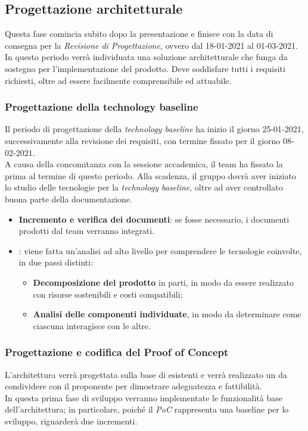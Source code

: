 \subsection{Progettazione architetturale}
Questa fase comincia subito dopo la presentazione e finisce con la data di consegna per la \textit{Revisione di Progettazione}, ovvero dal 18-01-2021 al 01-03-2021.\\
In questo periodo verrà individuata una soluzione architetturale che funga da sostegno per l'implementazione del prodotto. Deve soddisfare tutti i requisiti richiesti, oltre ad essere facilmente comprensibile ed attuabile. 

\subsubsection{Progettazione della technology baseline}

Il periodo di progettazione della \textit{technology baseline} ha inizio il giorno 25-01-2021, successivamente alla revisione dei requisiti, con termine fissato per il giorno 08-02-2021. \\ A causa della concomitanza con la sessione accademica, il team ha fissato la prima  al termine di questo periodo. Alla scadenza, il gruppo dovrà aver iniziato lo studio delle tecnologie per la \textit{technology baseline}, oltre ad aver controllato buona parte della documentazione.

\begin{itemize}
\item \textbf{Incremento e verifica dei documenti}: se fosse necessario, i documenti prodotti dal team verranno integrati.

 \item {}: viene fatta un'analisi ad alto livello per comprendere le tecnologie coinvolte, in due passi distinti:
\begin{itemize}
 \item \textbf{Decomposizione del prodotto} in parti, in modo da essere realizzato con risorse sostenibili e costi compatibili;
 \item \textbf{Analisi delle componenti individuate}, in modo da determinare come ciascuna interagisce con le altre.  
 
\end{itemize}
\end{itemize}

\subsubsection{Progettazione e codifica del Proof of Concept}
L'architettura verrà progettata sulla base di  esistenti e verrà realizzato un  da condividere con il proponente per dimostrare adeguatezza e fattibilità. \\ 
In questa prima fase di sviluppo verranno implementate le funzionalità base dell'architettura; in particolare, poiché il \textit{PoC} rappresenta una baseline per lo sviluppo, riguarderà due incrementi.

